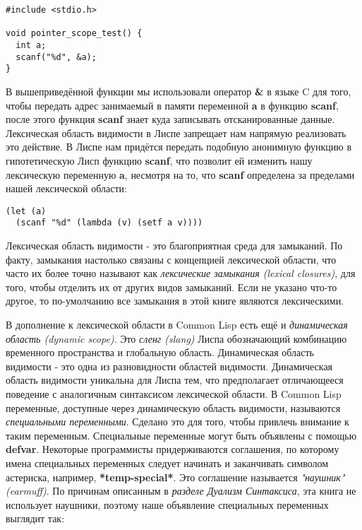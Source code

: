 \begin{verbatim}
#include <stdio.h>

void pointer_scope_test() {
  int a;
  scanf("%d", &a);
}
\end{verbatim}

В вышеприведённой функции мы использовали оператор \textbf{\&} в языке C для того, чтобы передать адрес занимаемый в памяти переменной \textbf{a} в функцию \textbf{scanf}, после этого функция \textbf{scanf} знает куда записывать отсканированные данные. Лексическая область видимости в Лиспе запрещает нам напрямую реализовать это действие. В Лиспе нам придётся передать подобную анонимную функцию в гипотетическую Лисп функцию \textbf{scanf}, что позволит ей изменить нашу лексическую переменную \textbf{a}, несмотря на то, что \textbf{scanf} определена за пределами нашей лексической области:

\begin{verbatim}
(let (a)
  (scanf "%d" (lambda (v) (setf a v))))
\end{verbatim}

Лексическая область видимости - это благоприятная среда для замыканий. По факту, замыкания настолько связаны с концепцией лексической области, что часто их более точно называют как \emph{лексические замыкания (lexical closures)}, для того, чтобы отделить их от других видов замыканий. Если не указано что-то другое, то по-умолчанию все замыкания в этой книге являются лексическими.

В дополнение к лексической области в Common Lisp есть ещё и \emph{динамическая область (dynamic scope)}. Это \emph{сленг (slang)} Лиспа обозначающий комбинацию временного пространства и глобальную область. Динамическая область видимости - это одна из разновидности областей видимости. Динамическая область видимости уникальна для Лиспа тем, что предполагает отличающееся поведение с аналогичным синтаксисом лексической области. В Common Lisp переменные, доступные через динамическую область видимости, называются \emph{специальными переменными}. Сделано это для того, чтобы привлечь внимание к таким переменным. Специальные переменные могут быть объявлены с помощью \textbf{defvar}. Некоторые программисты придерживаются соглашения, по которому имена специальных переменных следует начинать и заканчивать символом астериска, например, \textbf{*temp-special*}. Это соглашение называется \emph{"наушник" (earmuff)}. По причинам описанным в \emph{разделе Дуализм Синтаксиса}, эта книга не использует наушники, поэтому наше объявление специальных переменных выглядит так:

